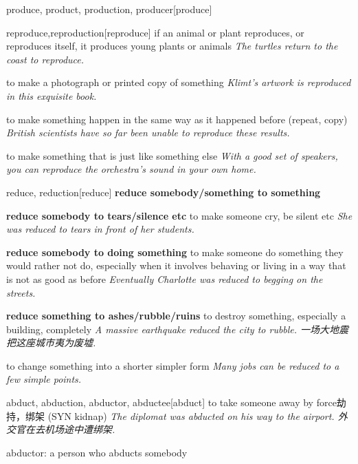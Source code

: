 \begin{DefWord}{produce, product, production, producer}[produce]
\end{DefWord}

\begin{DefWord}{reproduce,reproduction}[reproduce]
    if an animal or plant reproduces, or reproduces itself, it produces young plants or animals
    \textit{The turtles return to the coast to reproduce.}

    to make a photograph or printed copy of something
    \textit{Klimt's artwork is reproduced in this exquisite book.}

    to make something happen in the same way as it happened before (repeat, copy)
    \textit{British scientists have so far been unable to reproduce these results.}

    to make something that is just like something else
    \textit{With a good set of speakers, you can reproduce the orchestra's sound in your own home.}
\end{DefWord}

\begin{DefWord}{reduce, reduction}[reduce]
    \textbf{reduce somebody/something to something}

    \textbf{reduce somebody to tears/silence etc} to make someone cry, be silent etc
    \textit{She was reduced to tears in front of her students.}

    \textbf{reduce somebody to doing something} to make someone do something they would rather not do, especially when it involves behaving or living in a way that is not as good as before
    \textit{Eventually Charlotte was reduced to begging on the streets.}

    \textbf{reduce something to ashes/rubble/ruins}
    to destroy something, especially a building, completely
    \textit{A massive earthquake reduced the city to rubble. 一场大地震把这座城市夷为废墟. }

    to change something into a shorter simpler form
    \textit{Many jobs can be reduced to a few simple points.}
\end{DefWord}

\begin{DefWord}{abduct, abduction, abductor, abductee}[abduct]
    to take someone away by force劫持，绑架 (SYN  kidnap)
    \textit{The diplomat was abducted on his way to the airport.  外交官在去机场途中遭绑架. }

    abductor: a person who abducts somebody
\end{DefWord}

